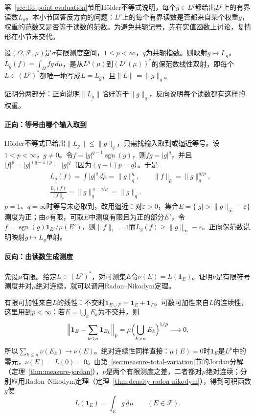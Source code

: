 第~\ref{sec:lfo-point-evaluation}节用Hölder不等式说明，每个$g\in L^q$都给出$L^p$上的有界读数$L_g$。本小节回答反方向的问题：$L^p$上的每个有界读数是否都来自某个权重$g$，权重的范数又是否等于读数的范数。为避免共轭记号，先在实值函数上讨论，复情形在小节末交代。

\begin{theorem}[$L^p$的对偶]
\label{thm:lfo-lp-dual}
设$(\Omega,\mathcal F,\mu)$是$\sigma$有限测度空间，$1\leq p<\infty$，$q$为共轭指数。则映射$g\mapsto L_g$，$L_g(f)=\int_\Omega fg\,d\mu$，是从$L^q(\mu)$到$(L^p(\mu))^*$的保范数线性双射，即每个$L\in(L^p)^*$都唯一地写成$L=L_g$，且$\|L\|=\|g\|_q$。
\end{theorem}

证明分两部分：正向说明$\|L_g\|$恰好等于$\|g\|_q$，反向说明每个读数都有这样的权重。

\paragraph{正向：等号由哪个输入取到}
Hölder不等式已给出$\|L_g\|\leq\|g\|_q$，只需找输入取到或逼近等号。设$1<p<\infty$，$g\neq0$。令$f=|g|^{q-1}\operatorname{sgn}(g)$，则$fg=|g|^q$，并且$|f|^p=|g|^{(q-1)p}=|g|^q$（因为$(q-1)p=q$）。于是
\[
 \begin{aligned}
 &L_g(f)=\int|g|^q\,d\mu=\|g\|_q^q,\qquad \|f\|_p=\|g\|_q^{q/p},\\
 &\frac{L_g(f)}{\|f\|_p}=\|g\|_q^{\,q-q/p}=\|g\|_q .
 \end{aligned}
\]
$p=1$、$q=\infty$时等号未必取到，改用逼近：对$\varepsilon>0$，集合$E=\{|g|>\|g\|_\infty-\varepsilon\}$测度为正；由$\sigma$有限，可取$E$中测度有限且为正的部分$E'$，令$f=\operatorname{sgn}(g)\mathbf 1_{E'}/\mu(E')$，则$\|f\|_1=1$而$L_g(f)\geq\|g\|_\infty-\varepsilon$。正向保范数说明映射$g\mapsto L_g$单射。

\paragraph{反向：由读数生成测度}
先设$\mu$有限。给定$L\in(L^p)^*$，对可测集$E$令$\nu(E)=L(\mathbf 1_E)$。证明$\nu$是有限符号测度并对$\mu$绝对连续，就可以调用Radon--Nikodym定理。

有限可加性来自$L$的线性：不交时$\mathbf 1_{E\cup F}=\mathbf 1_E+\mathbf 1_F$。可数可加性来自$L$的连续性，这里用到$p<\infty$：若$E=\bigcup_kE_k$为不交并，则
\[
 \Bigl\|\mathbf 1_E-\sum_{k\leq n}\mathbf 1_{E_k}\Bigr\|_p=\mu\Bigl(\bigcup_{k>n}E_k\Bigr)^{1/p}\longrightarrow0 ,
\]
所以$\sum_{k\leq n}\nu(E_k)\to\nu(E)$。绝对连续性同样直接：$\mu(E)=0$时$\mathbf 1_E$是$L^p$中的零元，$\nu(E)=L(0)=0$。由第~\ref{sec:measure-total-variation}节的Jordan分解（定理~\ref{thm:measure-jordan}），$\nu$是两个有限测度之差，二者都对$\mu$绝对连续；分别应用Radon--Nikodym定理（定理~\ref{thm:density-radon-nikodym}），得到可积函数$g$使
\[
 L(\mathbf 1_E)=\int_Eg\,d\mu\qquad(E\in\mathcal F).
\]

